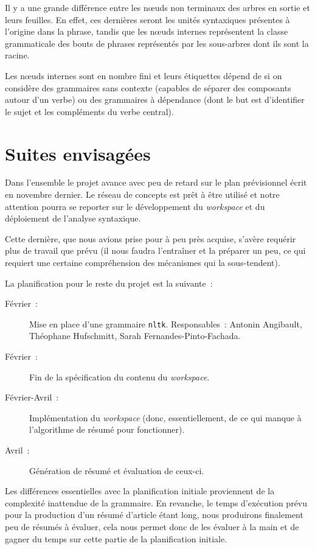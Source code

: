 \documentclass[a4paper, 12pt]{article}
\newcommand{\pyt}[1]{\texttt{#1}}%
\begin{document}
Il y a une grande différence entre les n\oe{}uds non terminaux des arbres en sortie et leurs feuilles. En effet, ces dernières seront les unités syntaxiques présentes à l'origine dans la phrase, tandis que les n\oe{}uds internes représentent la classe grammaticale des bouts de phrases représentés par les sous-arbres dont ils sont la racine.


Les n\oe{}uds internes sont en nombre fini et leurs étiquettes dépend de si on considère des grammaires sans contexte (capables de séparer des composants autour d'un verbe) ou des grammaires à dépendance (dont le but est d'identifier le sujet et les compléments du verbe central).


\section{Suites envisagées}

Dans l'ensemble le projet avance avec peu de retard sur le plan prévisionnel écrit en novembre dernier. Le réseau de concepts est prêt à être utilisé et notre attention pourra se reporter sur le développement du \textit{workspace} et du déploiement de l'analyse syntaxique.

Cette dernière, que nous avions prise pour à peu près acquise, s'avère requérir plus de travail que prévu (il nous faudra l'entraîner et la préparer un peu, ce qui requiert une certaine compréhension des mécanismes qui la sous-tendent).

La planification pour le reste du projet est la suivante~:
\begin{description}
	\item[Février~: ]Mise en place d'une grammaire \pyt{nltk}. Responsables~: Antonin Angibault, Théophane Hufschmitt, Sarah Fernandes-Pinto-Fachada.
	\item[Février~: ]Fin de la spécification du contenu du \textit{workspace}.
	\item[Février-Avril~: ]Implémentation du \textit{workspace} (donc, essentiellement, de ce qui manque à l'algorithme de résumé pour fonctionner).
	\item[Avril~: ]Génération de résumé et évaluation de ceux-ci.
\end{description}

Les différences essentielles avec la planification initiale proviennent de la complexité inattendue de la grammaire. En revanche, le temps d'exécution prévu pour la production d'un résumé d'article étant long, nous produirons finalement peu de résumés à évaluer, cela nous permet donc de les évaluer à la main et de gagner du temps sur cette partie de la planification initiale.
\end{document}
